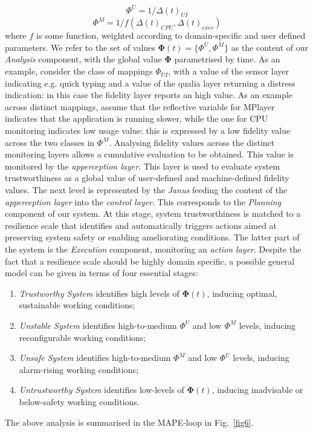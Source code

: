 \documentclass{article}
\begin{document}
\begin{equation}
\Phi^{U}= 1/\Delta(t)_{UI}
\end{equation}
\begin{equation}
\Phi^{M}= 1/f(\Delta(t)_{CPU},\Delta(t)_{exec})
\end{equation}
where $f$ is some function, weighted according to domain-specific and user defined parameters. We refer to the set of values $\mathbf{\Phi}(t)=\{\Phi^{U},\Phi^{M}\}$ as the content of our \textit{Analysis} component, with the global value $\mathbf{\Phi}$ parametrised by time. As an example, consider the class of mappings $\Phi_{UI}$, with a value of the sensor layer indicating e.g. quick typing and a value of the qualia layer returning a distress indication: in this case the fidelity layer reports an high value. As an example across distinct mappings, assume that the reflective variable for MPlayer indicates that the application is running slower, while the one for CPU monitoring indicates low usage value: this is expressed by a low fidelity value across the two classes in $\Phi^{M}$. Analysing fidelity values across the distinct monitoring layers allows a cumulative evaluation to be obtained. This value is monitored by the \textit{apperception layer}. This layer is used to evaluate system trustworthiness as a global value of user-defined and machine-defined fidelity values.
The next level is represented by the \textit{Janus} feeding the content of the \textit{apperception layer} into the \textit{control layer}. This corresponds to the \textit{Planning} component of our system.
At this stage, system trustworthiness is matched to a resilience scale that identifies and automatically triggers actions aimed at preserving system safety or enabling ameliorating conditions. The latter part of the system is the \textit{Execution} component, monitoring an \textit{action layer}.
Despite the fact that a resilience scale should be highly domain specific, a possible general model can be given in terms of four essential stages:

\begin{enumerate}
\item \textit{Trustworthy System} identifies high levels of $\mathbf{\Phi}(t)$, inducing optimal, sustainable working conditions;
\item \textit{Unstable System} identifies high-to-medium $\Phi^U$ and low $\Phi^M$ levels, inducing reconfigurable working conditions;
\item \textit{Unsafe System} identifies high-to-medium $\Phi^M$ and low $\Phi^U$ levels, inducing alarm-rising working conditions;
\item \textit{Untrustworthy System} identifies low-levels of $\mathbf{\Phi}(t)$, inducing inadvisable or below-safety working conditions.
\end{enumerate}
The above analysis is summarised in the MAPE-loop in Fig.~\ref{fig6}.
\end{document}
